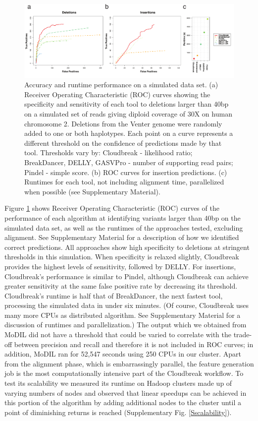\documentclass{bioinfo}
\begin{document}
\begin{figure}[!tpb]
\centering
\includegraphics[width=1\textwidth]{chr2_rocs_runtimes_journal.pdf}
\caption{Accuracy and runtime performance on a simulated data set. (a) Receiver Operating Characteristic (ROC) curves showing the specificity and sensitivity of each tool to deletions larger than 40bp on a simulated set of reads giving diploid coverage of 30X on human chromosome 2. Deletions from the Venter genome were randomly added to one or both haplotypes. Each point on a curve represents a different threshold on the confidence of predictions made by that tool. Thresholds vary by: Cloudbreak - likelihood ratio; BreakDancer, DELLY, GASVPro - number of supporting read pairs; Pindel - simple score. (b) ROC curves for insertion predictions. (c) Runtimes for each tool, not including alignment time, parallelized when possible (see Supplementary Material).}
\label{chr2CombinedRoc}
\end{figure}

Figure \ref{chr2CombinedRoc} shows Receiver Operating Characteristic (ROC) curves of the performance of each algorithm at identifying variants larger than 40bp on the simulated data set, as well as the runtimes of the approaches tested, excluding alignment. See Supplementary Material for a description of how we identified correct predictions. All approaches show high specificity to deletions at stringent thresholds in this simulation. When specificity is relaxed slightly, Cloudbreak provides the highest levels of sensitivity, followed by DELLY. For insertions, Cloudbreak's performance is similar to Pindel, although Cloudbreak can achieve greater sensitivity at the same false positive rate by decreasing its threshold. Cloudbreak's runtime is half that of BreakDancer, the next fastest tool, processing the simulated data in under six minutes. (Of course, Cloudbreak uses many more CPUs as distributed algorithm. See Supplementary Material for a discussion of runtimes and parallelization.) The output which we obtained from MoDIL did not have a threshold that could be varied to correlate with the trade-off between precision and recall and therefore it is not included in ROC curves; in addition, MoDIL ran for 52,547 seconds using 250 CPUs in our cluster. Apart from the alignment phase, which is embarrassingly parallel, the feature generation job is the most computationally intensive part of the Cloudbreak workflow. To test its scalability we measured its runtime on Hadoop clusters made up of varying numbers of nodes and observed that linear speedups can be achieved in this portion of the algorithm by adding additional nodes to the cluster until a point of diminishing returns is reached (Supplementary Fig. \ref{Sscalability}).
\end{document}
